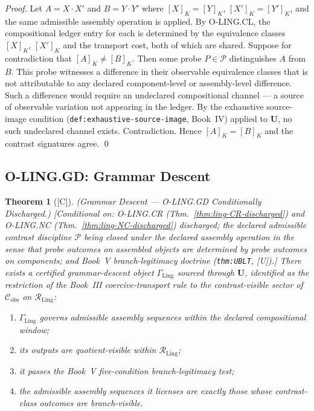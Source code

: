 \documentclass[12pt,oneside]{amsbook}
\theoremstyle{plain}
\newtheorem{theorem}{Theorem}[section]
\theoremstyle{definition}
\theoremstyle{remark}
\newcommand{\status}[1]{\textup{[#1]}}
\begin{document}
\begin{proof}
Let $A = X \cdot X'$ and $B = Y \cdot Y'$ where $[X]_K = [Y]_K$,
$[X']_K = [Y']_K$, and the same admissible assembly operation is
applied. By O-LING.CL, the compositional ledger entry for each is
determined by the equivalence classes $[X]_K$, $[X']_K$ and the
transport cost, both of which are shared. Suppose for contradiction
that $[A]_K \neq [B]_K$. Then some probe $P \in \mathcal{P}$
distinguishes $A$ from $B$. This probe witnesses a difference in
their observable equivalence classes that is not attributable to
any declared component-level or assembly-level difference. Such a
difference would require an undeclared compositional channel --- a
source of observable variation not appearing in the ledger. By the
exhaustive source-image condition
(\texttt{def:exhaustive-source-image}, Book~IV) applied to
$\mathbf{U}$, no such undeclared channel exists. Contradiction.
Hence $[A]_K = [B]_K$ and the contrast signatures agree.
\qed
\end{proof}

\subsection{O-LING.GD: Grammar Descent}\label{sec:ling-GD-discharge}

\begin{theorem}[\status{C}]\label{thm:ling-GD-discharged}
\textup{(Grammar Descent --- O-LING.GD Conditionally Discharged.)}
\textup{[Conditional on: O-LING.CR (Thm.~\ref{thm:ling-CR-discharged})
and O-LING.NC (Thm.~\ref{thm:ling-NC-discharged}) discharged; the
declared admissible contrast discipline $\mathcal{P}$ being closed
under the declared assembly operation in the sense that probe outcomes
on assembled objects are determined by probe outcomes on components;
and Book~V branch-legitimacy doctrine (\texttt{thm:UBLT}, [U]).]}
There exists a certified grammar-descent object $\Gamma_{\mathrm{Ling}}$
sourced through $\mathbf{U}$, identified as the restriction of the
Book~III coercive-transport rule to the contrast-visible sector of
$\mathcal{C}_{\mathrm{obs}}$ on $\mathcal{R}_{\mathrm{Ling}}$:
\begin{enumerate}[label=\textup{(\arabic*)}]
 \item $\Gamma_{\mathrm{Ling}}$ governs admissible assembly sequences
 within the declared compositional window;
 \item its outputs are quotient-visible within $\mathcal{R}_{\mathrm{Ling}}$;
 \item it passes the Book~V five-condition branch-legitimacy test;
 \item the admissible assembly sequences it licenses are exactly
 those whose contrast-class outcomes are branch-visible.
\end{enumerate}
\end{theorem}
\end{document}
